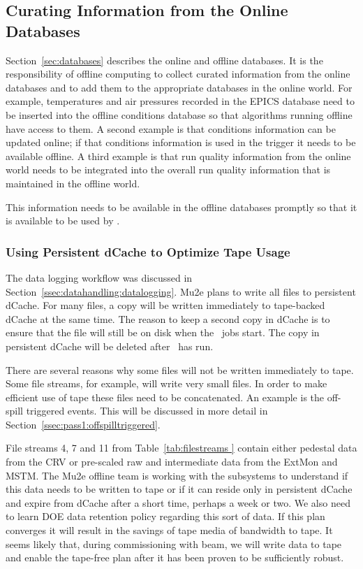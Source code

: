 \subsection{Curating Information from the Online Databases}
\label{ssec:onlineDatabases}
Section~\ref{sec:databases} describes the online and offline databases.  It is the responsibility of offline computing to collect curated information from the online databases and to add them to the appropriate databases in the online world.  For example, temperatures and air pressures recorded in the EPICS database need to be inserted into the offline conditions database so that algorithms running offline have access to them.  A second example is that conditions information can be updated online; if that conditions information is used in the trigger it needs to be available offline.
A third example is that run quality information from the online world needs to be integrated into the overall run quality information that is maintained in the offline world.  

This information needs to be available in the offline databases promptly so that it is available to be used by \passone.

\subsubsection{Using Persistent dCache to Optimize Tape Usage}
\label{ssec:optimizeTapeUsage}

The data logging workflow was discussed in Section~\ref{ssec:datahandling:datalogging}.  Mu2e plans to write all files to persistent dCache.  For many files, a copy will be written immediately to tape-backed dCache at the same time.  The reason to keep a second copy in dCache is to ensure that the file will still be on disk when the \passone\ jobs start.  The copy in persistent dCache will be deleted after \passone\ has run.

There are several reasons why some files will not be written immediately to tape.  Some file streams, for example, will write very small files.  In order to make efficient use of tape these files need to be concatenated. An example is the off-spill triggered events.  This will be discussed in more detail in Section~\ref{ssec:pass1:offspilltriggered}. 

File streams 4, 7 and 11 from Table~\ref{tab:filestreams } contain either pedestal data from the CRV or pre-scaled raw and intermediate data from the ExtMon and MSTM.  The Mu2e offline team is working with the subsystems to understand if this data needs to be written to tape or if it can reside only in persistent dCache and expire from dCache after a short time, perhaps a week or two.  We also need to learn DOE data retention policy regarding this sort of data.  If this plan converges it will result in the savings of tape media of bandwidth to tape.  It seems likely that, during commissioning with beam, we will write data to tape and enable the tape-free plan after it has been proven to be sufficiently robust.

